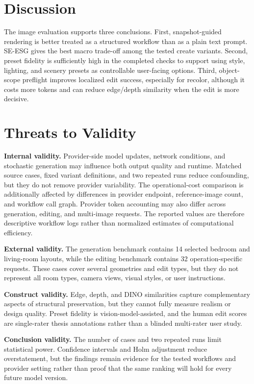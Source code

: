 \section{Discussion}\label{subsec:eval-image-discussion}

The image evaluation supports three conclusions. First, snapshot-guided rendering is better treated as a structured workflow than as a plain text prompt. SE-ESG gives the best macro trade-off among the tested create variants. Second, preset fidelity is sufficiently high in the completed checks to support using style, lighting, and scenery presets as controllable user-facing options. Third, object-scope preflight improves localized edit success, especially for recolor, although it costs more tokens and can reduce edge/depth similarity when the edit is more decisive.

\section{Threats to Validity}\label{sec:eval-threats-to-validity}

\noindent\textbf{Internal validity.}
Provider-side model updates, network conditions, and stochastic generation may influence both output quality and runtime. Matched source cases, fixed variant definitions, and two repeated runs reduce confounding, but they do not remove provider variability. The operational-cost comparison is additionally affected by differences in provider endpoint, reference-image count, and workflow call graph. Provider token accounting may also differ across generation, editing, and multi-image requests. The reported values are therefore descriptive workflow logs rather than normalized estimates of computational efficiency.

\noindent\textbf{External validity.}
The generation benchmark contains 14 selected bedroom and living-room layouts, while the editing benchmark contains 32 operation-specific requests. These cases cover several geometries and edit types, but they do not represent all room types, camera views, visual styles, or user instructions.

\noindent\textbf{Construct validity.}
Edge, depth, and DINO similarities capture complementary aspects of structural preservation, but they cannot fully measure realism or design quality. Preset fidelity is vision-model-assisted, and the human edit scores are single-rater thesis annotations rather than a blinded multi-rater user study.

\noindent\textbf{Conclusion validity.}
The number of cases and two repeated runs limit statistical power. Confidence intervals and Holm adjustment reduce overstatement, but the findings remain evidence for the tested workflows and provider setting rather than proof that the same ranking will hold for every future model version.

